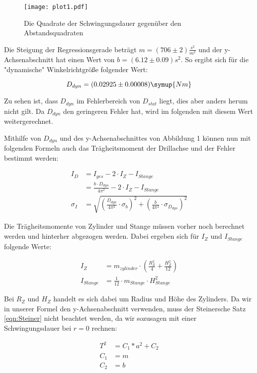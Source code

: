 \begin{figure}
  \texttt{[image: plot1.pdf]}
  \caption{Die Quadrate der Schwingungsdauer gegenüber den Abstandsquadraten}
\end{figure}

Die Steigung der Regressionsgerade beträgt $m = (706 \pm 2) \frac{s^2}{m^2}$ und
der y-Achsenabschnitt hat einen Wert von $b = (6.12 \pm 0.09) s^2$. So ergibt sich für
die "dynamische" Winkelrichtgröße folgender Wert:

\begin{equation}
  D_{dyn} = (0.02925 \pm 0.00008) \symup{Nm}
\end{equation}

Zu sehen ist, dass $D_{dyn}$ im Fehlerbereich von $D_{stat}$ liegt, dies aber anders herum nicht
gilt. Da $D_{dyn}$ den geringeren Fehler hat, wird im folgenden mit diesem Wert weitergerechnet.

Mithilfe von $D_{dyn}$ und des y-Achsenabschnittes von Abbildung 1 können nun mit folgenden Formeln
auch das Trägheitsmoment der Drillachse und der Fehler bestimmt werden:

\begin{align}
  I_D        &= I_{ges} - 2 \cdot I_{Z} - I_{Stange}\\
             &= \frac{b \cdot D_{dyn}}{4 \pi^2} - 2 \cdot I_{Z} - I_{Stange}\\
  \sigma_I   &= \sqrt{ \left( \frac{D_{dyn}}{4\pi^2} \cdot \sigma_b \right) ^2 + \left( \frac{b}{4\pi^2} \cdot \sigma_{D_{dyn}} \right) ^2}
\end{align}

Die Trägheitsmomente von Zylinder und Stange müssen vorher noch berechnet werden und hinterher abgezogen werden.
Dabei ergeben sich für $I_{Z}$ und $I_{Stange}$ folgende Werte:

\begin{align}
  I_Z        &= m_{zylinder} \cdot \left( \frac{R_Z^2}{4} + \frac{H_Z^2}{12} \right)\\
  I_{Stange} &= \frac{1}{12} \cdot m_{Stange} \cdot H_{Stange}^2
\end{align}

Bei $R_Z$ und $H_Z$ handelt es sich dabei um Radius und Höhe des Zylinders. Da wir in unserer Formel
den y-Achsenabschnitt verwenden, muss der Steinersche Satz \eqref{eqn:Steiner} nicht beachtet werden, da wir sozusagen
mit einer Schwingungsdauer bei $r=0$ rechnen:

\begin{align}
  T^2 &= C_1 * a^2 + C_2 \\
  C_1 &= m \\
  C_2 &= b
\end{align}


